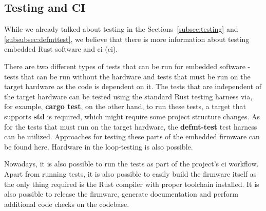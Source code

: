 \subsection{Testing and CI}
\label{subsec:testing_ci}
While we already talked about testing in the Sections~\ref{subsec:testing} and \ref{subsubsec:defmttest}, we believe that there is more information about testing embedded Rust software and \acs{ci} (\acl{ci}).

There are two different types of tests that can be run for embedded software - tests that can be run without the hardware and tests that must be run on the target hardware as the code is dependent on it.
The tests that are independent of the target hardware can be tested using the standard Rust testing harness via, for example, \textbf{cargo test}, on the other hand, to run these tests, a target that supports \textbf{std} is required, which might require some project structure changes.
As for the tests that must run on the target hardware, the \textbf{defmt-test} test harness can be utilized.
Approaches for testing these parts of the embedded firmware can be found here\cite{aparicio_testing_nodate,aparicio_testing_nodate-1}.
Hardware in the loop-testing is also possible\cite{schievink_running_nodate}.

Nowadays, it is also possible to run the tests as part of the project's \acs{ci} workflow.
Apart from running tests, it is also possible to easily build the firmware itself as the only thing required is the Rust compiler with proper toolchain installed\cite{vahter_release_nodate}.
It is also possible to release the firmware, generate documentation and perform additional code checks on the codebase\cite{chiovoloni_few_2020}.

\newpage
